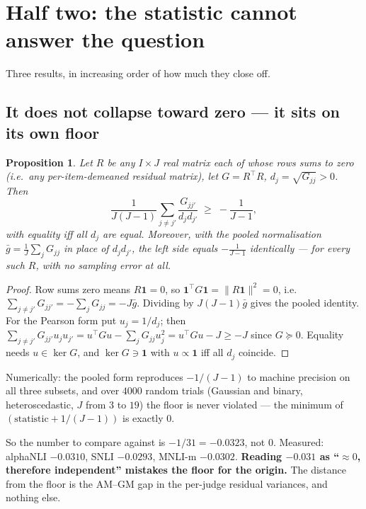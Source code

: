 \documentclass[11pt]{article}
\newtheorem{proposition}{Proposition}
\theoremstyle{definition}
\begin{document}
\section{Half two: the statistic cannot answer the question}

Three results, in increasing order of how much they close off.

\subsection{It does not collapse toward zero --- it sits on its own floor}

\begin{proposition}\label{prop:floor}
Let $R$ be any $I\times J$ real matrix each of whose rows sums to zero (i.e.\ any
per-item-demeaned residual matrix), let $G=R^{\top}R$, $d_j=\sqrt{G_{jj}}>0$. Then
\[
  \frac{1}{J(J-1)}\sum_{j\ne j'}\frac{G_{jj'}}{d_jd_{j'}}\;\ge\;-\frac{1}{J-1},
\]
with equality iff all $d_j$ are equal. Moreover, with the \emph{pooled}
normalisation $\bar g=\frac1J\sum_jG_{jj}$ in place of $d_jd_{j'}$, the left side
equals $-\frac{1}{J-1}$ \emph{identically} --- for every such $R$, with no sampling
error at all.
\end{proposition}

\begin{proof}
Row sums zero means $R\mathbf 1=0$, so $\mathbf 1^{\top}G\mathbf 1=\|R\mathbf
1\|^2=0$, i.e.\ $\sum_{j\ne j'}G_{jj'}=-\sum_jG_{jj}=-J\bar g$. Dividing by
$J(J-1)\bar g$ gives the pooled identity. For the Pearson form put $u_j=1/d_j$; then
$\sum_{j\ne j'}G_{jj'}u_ju_{j'}=u^{\top}Gu-\sum_jG_{jj}u_j^2=u^{\top}Gu-J\ge-J$
since $G\succeq0$. Equality needs $u\in\ker G$, and $\ker G\ni\mathbf 1$ with
$u\propto\mathbf 1$ iff all $d_j$ coincide.
\end{proof}

\noindent Numerically: the pooled form reproduces $-1/(J-1)$ to machine precision on
all three subsets, and over $4000$ random trials (Gaussian and binary,
heteroscedastic, $J$ from $3$ to $19$) the floor is never violated --- the minimum of
$(\text{statistic}+1/(J-1))$ is exactly $0$.

So the number to compare against is $-1/31=-0.0323$, not $0$. Measured: alphaNLI
$-0.0310$, SNLI $-0.0293$, MNLI-m $-0.0302$. \textbf{Reading $-0.031$ as
``$\approx0$, therefore independent'' mistakes the floor for the origin.} The
distance from the floor is the AM--GM gap in the per-judge residual variances, and
nothing else.
\end{document}
